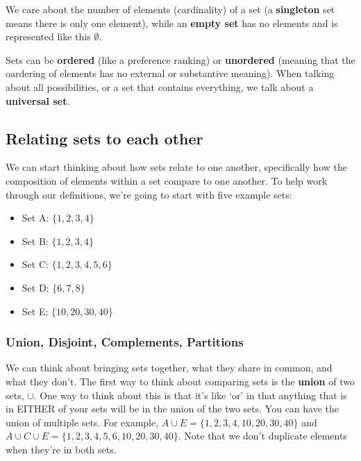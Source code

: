 \documentclass[
]{book}
\providecommand{\tightlist}{%
  \setlength{\itemsep}{0pt}\setlength{\parskip}{0pt}}
\begin{document}
We care about the number of elements (cardinality) of a set (a \textbf{singleton} set means there is only one element), while an \textbf{empty set} has no elements and is represented like this \(\emptyset\).

Sets can be \textbf{ordered} (like a preference ranking) or \textbf{unordered} (meaning that the oardering of elements has no external or substantive meaning). When talking about all possibilities, or a set that contains everything, we talk about a \textbf{universal set}.

\hypertarget{relating-sets-to-each-other}{%
\subsection{Relating sets to each other}\label{relating-sets-to-each-other}}

We can start thinking about how sets relate to one another, specifically how the composition of elements within a set compare to one another. To help work through our definitions, we're going to start with five example sets:

\begin{itemize}
\tightlist
\item
  Set A: \(\{ 1, 2, 3, 4 \}\)
\item
  Set B: \(\{1, 2, 3, 4 \}\)
\item
  Set C: \(\{1, 2, 3, 4, 5, 6 \}\)
\item
  Set D: \(\{6, 7, 8\}\)
\item
  Set E: \(\{10, 20, 30, 40 \}\)
\end{itemize}

\hypertarget{union-disjoint-complements-partitions}{%
\subsubsection{Union, Disjoint, Complements, Partitions}\label{union-disjoint-complements-partitions}}

We can think about bringing sets together, what they share in common, and what they don't. The first way to think about comparing sets is the \textbf{union} of two sets, \(\cup\). One way to think about this is that it's like `or' in that anything that is in EITHER of your sets will be in the union of the two sets. You can have the union of multiple sets. For example, \(A \cup E= \{ 1, 2, 3, 4, 10, 20, 30, 40\}\) and \(A \cup C \cup E = \{1, 2, 3, 4, 5, 6, 10, 20, 30, 40\}\). Note that we don't duplicate elements when they're in both sets.
\end{document}
